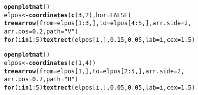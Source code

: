 \documentclass{article}\usepackage[]{graphicx}\usepackage[]{xcolor}
\makeatletter
\newcommand{\hlnum}[1]{\textcolor[rgb]{0.686,0.059,0.569}{#1}}%
\newcommand{\hlsng}[1]{\textcolor[rgb]{0.192,0.494,0.8}{#1}}%
\newcommand{\hlopt}[1]{\textcolor[rgb]{0,0,0}{#1}}%
\newcommand{\hldef}[1]{\textcolor[rgb]{0.345,0.345,0.345}{#1}}%
\newcommand{\hlkwa}[1]{\textcolor[rgb]{0.161,0.373,0.58}{\textbf{#1}}}%
\newcommand{\hlkwb}[1]{\textcolor[rgb]{0.69,0.353,0.396}{#1}}%
\newcommand{\hlkwc}[1]{\textcolor[rgb]{0.333,0.667,0.333}{#1}}%
\newcommand{\hlkwd}[1]{\textcolor[rgb]{0.737,0.353,0.396}{\textbf{#1}}}%
\newenvironment{kframe}{%
 \def\at@end@of@kframe{}%
 \ifinner\ifhmode%
  \def\at@end@of@kframe{\end{minipage}}%
  \begin{minipage}{\columnwidth}%
 \fi\fi%
 \def\FrameCommand##1{\hskip\@totalleftmargin \hskip-\fboxsep
 \colorbox{shadecolor}{##1}\hskip-\fboxsep
     \hskip-\linewidth \hskip-\@totalleftmargin \hskip\columnwidth}%
 \MakeFramed {\advance\hsize-\width
   \@totalleftmargin\z@ \linewidth\hsize
   \@setminipage}}%
 {\par\unskip\endMakeFramed%
 \at@end@of@kframe}
\newenvironment{knitrout}{}{} %
\makeatother
\begin{document}
\begin{knitrout}
\begin{kframe}
\begin{alltt}
\hlkwd{openplotmat}\hldef{()}
\hldef{elpos} \hlkwb{<-} \hlkwd{coordinates}\hldef{(}\hlkwd{c}\hldef{(}\hlnum{3}\hldef{,} \hlnum{2}\hldef{),} \hlkwc{hor} \hldef{=} \hlnum{FALSE}\hldef{)}
\hlkwd{treearrow}\hldef{(}\hlkwc{from} \hldef{= elpos[}\hlnum{1}\hlopt{:}\hlnum{3}\hldef{, ],} \hlkwc{to} \hldef{= elpos[}\hlnum{4}\hlopt{:}\hlnum{5}\hldef{, ],} \hlkwc{arr.side} \hldef{=} \hlnum{2}\hldef{,}
    \hlkwc{arr.pos} \hldef{=} \hlnum{0.2}\hldef{,} \hlkwc{path} \hldef{=} \hlsng{"V"}\hldef{)}
\hlkwa{for} \hldef{(i} \hlkwa{in} \hlnum{1}\hlopt{:}\hlnum{5}\hldef{)} \hlkwd{textrect}\hldef{(elpos[i, ],} \hlnum{0.15}\hldef{,} \hlnum{0.05}\hldef{,} \hlkwc{lab} \hldef{= i,} \hlkwc{cex} \hldef{=} \hlnum{1.5}\hldef{)}

\hlkwd{openplotmat}\hldef{()}
\hldef{elpos} \hlkwb{<-} \hlkwd{coordinates}\hldef{(}\hlkwd{c}\hldef{(}\hlnum{1}\hldef{,} \hlnum{4}\hldef{))}
\hlkwd{treearrow}\hldef{(}\hlkwc{from} \hldef{= elpos[}\hlnum{1}\hldef{, ],} \hlkwc{to} \hldef{= elpos[}\hlnum{2}\hlopt{:}\hlnum{5}\hldef{, ],} \hlkwc{arr.side} \hldef{=} \hlnum{2}\hldef{,}
    \hlkwc{arr.pos} \hldef{=} \hlnum{0.7}\hldef{,} \hlkwc{path} \hldef{=} \hlsng{"H"}\hldef{)}
\hlkwa{for} \hldef{(i} \hlkwa{in} \hlnum{1}\hlopt{:}\hlnum{5}\hldef{)} \hlkwd{textrect}\hldef{(elpos[i, ],} \hlnum{0.05}\hldef{,} \hlnum{0.05}\hldef{,} \hlkwc{lab} \hldef{= i,} \hlkwc{cex} \hldef{=} \hlnum{1.5}\hldef{)}


\end{alltt}
\end{kframe}
\end{knitrout}
\end{document}

